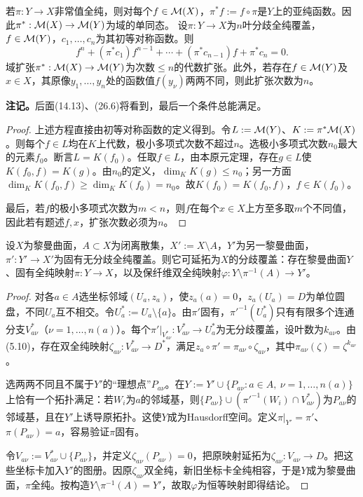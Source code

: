 若$\pi:Y\to X$非常值全纯，则对每个$f\in\mathcal M(X)$，$\pi^*f:=f\circ\pi$是$Y$上的亚纯函数。因此$\pi^*:\mathcal M(X)\to\mathcal M(Y)$为域的单同态。
设$\pi:Y\to X$为$n$叶分歧全纯覆盖，$f\in\mathcal M(Y)$，$c_1,\ldots,c_n$为其初等对称函数。则
\[
f^n+(\pi^*c_1)f^{n-1}+\cdots+(\pi^*c_{n-1})f+\pi^*c_n=0.
\]
域扩张$\pi^*:\mathcal M(X)\to\mathcal M(Y)$为次数$\le n$的代数扩张。此外，若存在$f\in\mathcal M(Y)$及$x\in X$，其原像$y_1,\ldots,y_n$处的函数值$f(y_\nu)$两两不同，则此扩张次数为$n$。

\textbf{注记。}后面(14.13)、(26.6)将看到，最后一个条件总能满足。
\begin{proof}
上述方程直接由初等对称函数的定义得到。令$L:=\mathcal M(Y)$、$K:=\pi^*\mathcal M(X)$。则每个$f\in L$均在$K$上代数，极小多项式次数不超过$n$。选极小多项式次数$n_0$最大的元素$f_0$。断言$L=K(f_0)$。任取$f\in L$，由本原元定理，存在$g\in L$使$K(f_0,f)=K(g)$。由$n_0$的定义，$\dim_KK(g)\le n_0$；另一方面$\dim_KK(f_0,f)\ge\dim_KK(f_0)=n_0$。故$K(f_0)=K(f_0,f)$，$f\in K(f_0)$。

最后，若$f$的极小多项式次数为$m<n$，则$f$在每个$x\in X$上方至多取$m$个不同值，因此若有题述$f,x$，扩张次数必须为$n$。
\end{proof}
设$X$为黎曼曲面，$A\subset X$为闭离散集，$X':=X\setminus A$，$Y'$为另一黎曼曲面，$\pi':Y'\to X'$为固有无分歧全纯覆盖。则它可延拓为$X$的分歧覆盖：存在黎曼曲面$Y$、固有全纯映射$\pi:Y\to X$，以及保纤维双全纯映射$\varphi:Y\setminus\pi^{-1}(A)\to Y'$。
\begin{proof}
对各$a\in A$选坐标邻域$(U_a,z_a)$，使$z_a(a)=0$，$z_a(U_a)=D$为单位圆盘，不同$U_a$互不相交。令$U_a^*:=U_a\setminus\{a\}$。由$\pi'$固有，$\pi'^{-1}(U_a^*)$只有有限多个连通分支$V_{a\nu}^*$（$\nu=1,\ldots,n(a)$）。每个$\pi'|_{V_{a\nu}^*}:V_{a\nu}^*\to U_a^*$为无分歧覆盖，设叶数为$k_{a\nu}$。由(5.10)，存在双全纯映射$\zeta_{a\nu}:V_{a\nu}^*\to D^*$，满足$z_a\circ\pi'=\pi_{a\nu}\circ\zeta_{a\nu}$，其中$\pi_{a\nu}(\zeta)=\zeta^{k_{a\nu}}$。

选两两不同且不属于$Y'$的“理想点”$P_{a\nu}$。在$Y:=Y'\cup\{P_{a\nu}:a\in A,\ \nu=1,\ldots,n(a)\}$上恰有一个拓扑满足：若$W_i$为$a$的邻域基，则$\{P_{a\nu}\}\cup(\pi'^{-1}(W_i)\cap V_{a\nu}^*)$为$P_{a\nu}$的邻域基，且在$Y'$上诱导原拓扑。这使$Y$成为Hausdorff空间。定义$\pi|_{Y'}=\pi'$、$\pi(P_{a\nu})=a$，容易验证$\pi$固有。

令$V_{a\nu}:=V_{a\nu}^*\cup\{P_{a\nu}\}$，并定义$\zeta_{a\nu}(P_{a\nu})=0$，把原映射延拓为$\zeta_{a\nu}:V_{a\nu}\to D$。把这些坐标卡加入$Y'$的图册。因原$\zeta_{a\nu}$双全纯，新旧坐标卡全纯相容，于是$Y$成为黎曼曲面，$\pi$全纯。按构造$Y\setminus\pi^{-1}(A)=Y'$，故取$\varphi$为恒等映射即得结论。
\end{proof}

